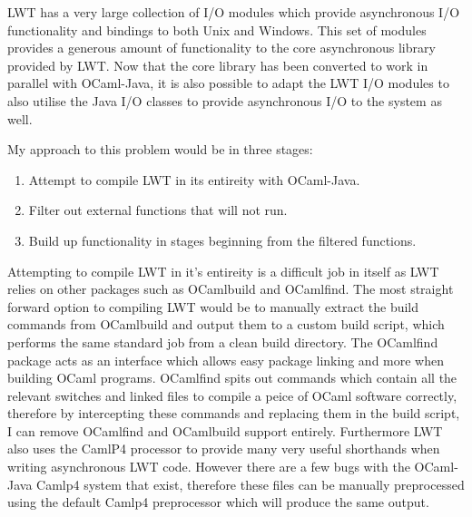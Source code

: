 \documentclass[12pt,twoside,notitlepage]{report}
\begin{document}
%
%

%
%

%
%

%
%
LWT has a very large collection of I/O modules which provide asynchronous I/O functionality and bindings to both Unix and Windows. This set of modules provides a generous amount of functionality to the core asynchronous library
provided by LWT. Now that the core library has been converted to work in parallel with OCaml-Java, it is also possible to adapt the LWT I/O modules to also utilise the Java I/O classes to provide asynchronous I/O to the system as
well. 

My approach to this problem would be in three stages:

\begin{enumerate}
\item Attempt to compile LWT in its entireity with OCaml-Java.
\item Filter out external functions that will not run.
\item Build up functionality in stages beginning from the filtered functions.
\end{enumerate}

Attempting to compile LWT in it's entireity is a difficult job in itself as LWT relies on other packages such as OCamlbuild and OCamlfind. The most straight forward option to compiling LWT would be to manually extract the build
commands from OCamlbuild and output them to a custom build script, which performs the same standard job from a clean build directory. The OCamlfind package acts as an interface which allows easy package linking and more when building
OCaml programs. OCamlfind spits out commands which contain all the relevant switches and linked files to compile a peice of OCaml software correctly, therefore by intercepting these commands and replacing them in the build script, I
can remove OCamlfind and OCamlbuild support entirely. Furthermore LWT also uses the CamlP4 processor to provide many very useful shorthands when writing asynchronous LWT code. However there are a few bugs with the OCaml-Java Camlp4
system that exist, therefore these files can be manually preprocessed using the default Camlp4 preprocessor which will produce the same output.
\end{document}
